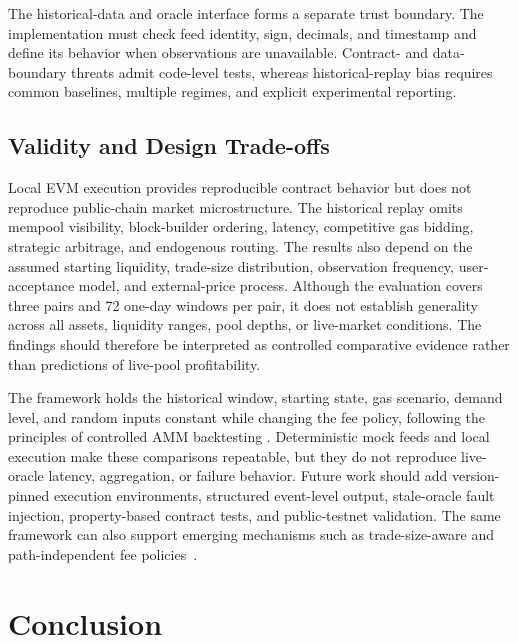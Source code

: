 \documentclass[a4paper,conference]{IEEEtran}
\begin{document}
The historical-data and oracle interface forms a separate trust boundary. The implementation must check feed identity, sign, decimals, and timestamp and define its behavior when observations are unavailable. Contract- and data-boundary threats admit code-level tests, whereas historical-replay bias requires common baselines, multiple regimes, and explicit experimental reporting.

\subsection{Validity and Design Trade-offs}

Local EVM execution provides reproducible contract behavior but does
not reproduce public-chain market microstructure. The historical
replay omits mempool visibility, block-builder ordering, latency,
competitive gas bidding, strategic arbitrage, and endogenous routing.
The results also depend on the assumed starting liquidity, trade-size
distribution, observation frequency, user-acceptance model, and
external-price process. Although the evaluation covers three pairs and
72 one-day windows per pair, it does not establish generality across
all assets, liquidity ranges, pool depths, or live-market conditions.
The findings should therefore be interpreted as controlled comparative
evidence rather than predictions of live-pool profitability.

The framework holds the historical window, starting state, gas
scenario, demand level, and random inputs constant while changing the
fee policy, following the principles of controlled AMM backtesting
\cite{urusov2025backtesting}. Deterministic mock feeds and local
execution make these comparisons repeatable, but they do not reproduce
live-oracle latency, aggregation, or failure behavior. Future work
should add version-pinned execution environments, structured
event-level output, stale-oracle fault injection, property-based
contract tests, and public-testnet validation. The same framework can
also support emerging mechanisms such as trade-size-aware and
path-independent fee policies~\cite{11575501}.

\section{Conclusion}
\end{document}
